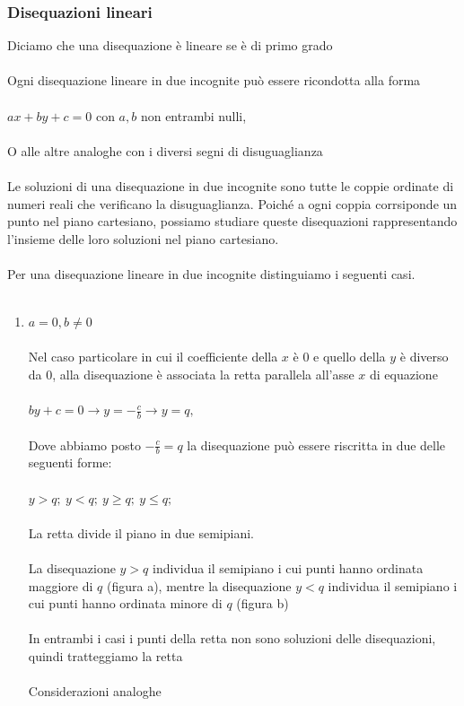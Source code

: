 \documentclass{report}
\begin{document}
\subsubsection{Disequazioni lineari} %
\label{sec:Disequazioni lineari}
Diciamo che una disequazione è lineare se è di primo grado 
\\
\\
Ogni disequazione lineare in due incognite può essere ricondotta alla forma
\\
\\
$ax + by + c = 0$ con $a, b$ non entrambi nulli,
\\
\\
O alle altre analoghe con i diversi segni di disuguaglianza
\\
\\
Le soluzioni di una disequazione in due incognite sono tutte le coppie ordinate di numeri reali che verificano la disuguaglianza. Poiché a ogni coppia corrsiponde un punto nel piano cartesiano, possiamo studiare queste disequazioni rappresentando l'insieme delle loro soluzioni nel piano cartesiano.
\\
\\
Per una disequazione lineare in due incognite distinguiamo i seguenti casi.
\\
\\
\begin{enumerate}
  \item{$a = 0, b \neq 0$ \\ \\
Nel caso particolare in cui il coefficiente della $x$ è $0$ e quello della $y$ è diverso da $0$,
alla disequazione è associata la retta parallela all'asse $x$ di equazione
\\
\\
$by + c = 0 \rightarrow y = -\frac{c}{b} \rightarrow y = q,$
\\
\\
Dove abbiamo posto $-\frac{c}{b}=q$ la disequazione può essere riscritta in due delle seguenti forme:
\\
\\
$y > q; \ y < q; \ y \ge q; \ y \le q;$
\\
\\
La retta divide il piano in due semipiani.
\\
\\
La disequazione $y > q$ individua il semipiano i cui punti hanno ordinata maggiore di $q$ (figura a), mentre la disequazione $y < q$ individua il semipiano i cui punti hanno ordinata minore di $q$ (figura b)
\\
\\
In entrambi i casi i punti della retta non sono soluzioni delle disequazioni, quindi tratteggiamo la retta 
\\
\\
Considerazioni analoghe 

}
\end{enumerate}


\end{document}

